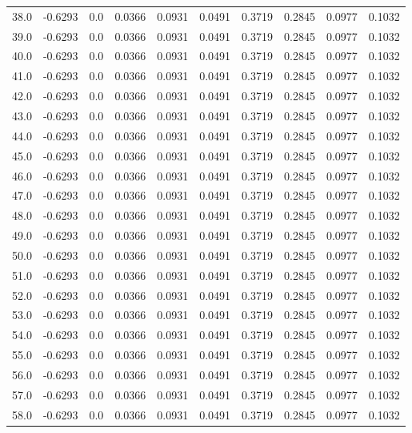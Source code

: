 \begin{longtable}{lrrrrrrrrr}
38.0 & -0.6293 & 0.0 & 0.0366 & 0.0931 & 0.0491 & 0.3719 & 0.2845 & 0.0977 & 0.1032 \\
39.0 & -0.6293 & 0.0 & 0.0366 & 0.0931 & 0.0491 & 0.3719 & 0.2845 & 0.0977 & 0.1032 \\
40.0 & -0.6293 & 0.0 & 0.0366 & 0.0931 & 0.0491 & 0.3719 & 0.2845 & 0.0977 & 0.1032 \\
41.0 & -0.6293 & 0.0 & 0.0366 & 0.0931 & 0.0491 & 0.3719 & 0.2845 & 0.0977 & 0.1032 \\
42.0 & -0.6293 & 0.0 & 0.0366 & 0.0931 & 0.0491 & 0.3719 & 0.2845 & 0.0977 & 0.1032 \\
43.0 & -0.6293 & 0.0 & 0.0366 & 0.0931 & 0.0491 & 0.3719 & 0.2845 & 0.0977 & 0.1032 \\
44.0 & -0.6293 & 0.0 & 0.0366 & 0.0931 & 0.0491 & 0.3719 & 0.2845 & 0.0977 & 0.1032 \\
45.0 & -0.6293 & 0.0 & 0.0366 & 0.0931 & 0.0491 & 0.3719 & 0.2845 & 0.0977 & 0.1032 \\
46.0 & -0.6293 & 0.0 & 0.0366 & 0.0931 & 0.0491 & 0.3719 & 0.2845 & 0.0977 & 0.1032 \\
47.0 & -0.6293 & 0.0 & 0.0366 & 0.0931 & 0.0491 & 0.3719 & 0.2845 & 0.0977 & 0.1032 \\
48.0 & -0.6293 & 0.0 & 0.0366 & 0.0931 & 0.0491 & 0.3719 & 0.2845 & 0.0977 & 0.1032 \\
49.0 & -0.6293 & 0.0 & 0.0366 & 0.0931 & 0.0491 & 0.3719 & 0.2845 & 0.0977 & 0.1032 \\
50.0 & -0.6293 & 0.0 & 0.0366 & 0.0931 & 0.0491 & 0.3719 & 0.2845 & 0.0977 & 0.1032 \\
51.0 & -0.6293 & 0.0 & 0.0366 & 0.0931 & 0.0491 & 0.3719 & 0.2845 & 0.0977 & 0.1032 \\
52.0 & -0.6293 & 0.0 & 0.0366 & 0.0931 & 0.0491 & 0.3719 & 0.2845 & 0.0977 & 0.1032 \\
53.0 & -0.6293 & 0.0 & 0.0366 & 0.0931 & 0.0491 & 0.3719 & 0.2845 & 0.0977 & 0.1032 \\
54.0 & -0.6293 & 0.0 & 0.0366 & 0.0931 & 0.0491 & 0.3719 & 0.2845 & 0.0977 & 0.1032 \\
55.0 & -0.6293 & 0.0 & 0.0366 & 0.0931 & 0.0491 & 0.3719 & 0.2845 & 0.0977 & 0.1032 \\
56.0 & -0.6293 & 0.0 & 0.0366 & 0.0931 & 0.0491 & 0.3719 & 0.2845 & 0.0977 & 0.1032 \\
57.0 & -0.6293 & 0.0 & 0.0366 & 0.0931 & 0.0491 & 0.3719 & 0.2845 & 0.0977 & 0.1032 \\
58.0 & -0.6293 & 0.0 & 0.0366 & 0.0931 & 0.0491 & 0.3719 & 0.2845 & 0.0977 & 0.1032 \\

\end{longtable}
